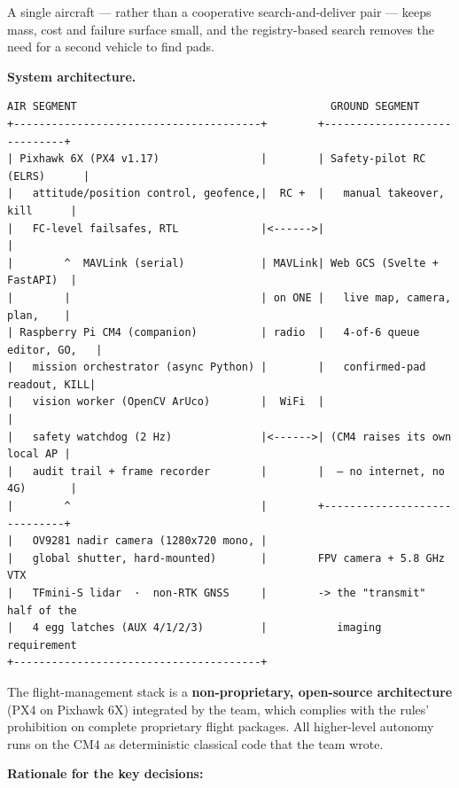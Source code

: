 \documentclass[
  10pt,
  a4paper,
  titlepage]{article}
\begin{document}
A single aircraft --- rather than a cooperative search-and-deliver pair
--- keeps mass, cost and failure surface small, and the registry-based
search removes the need for a second vehicle to find pads.

\textbf{System architecture.}

\begin{verbatim}
AIR SEGMENT                                        GROUND SEGMENT
+---------------------------------------+        +-----------------------------+
| Pixhawk 6X (PX4 v1.17)                |        | Safety-pilot RC (ELRS)      |
|   attitude/position control, geofence,|  RC +  |   manual takeover, kill      |
|   FC-level failsafes, RTL             |<------>|                             |
|        ^  MAVLink (serial)            | MAVLink| Web GCS (Svelte + FastAPI)  |
|        |                              | on ONE |   live map, camera, plan,    |
| Raspberry Pi CM4 (companion)          | radio  |   4-of-6 queue editor, GO,   |
|   mission orchestrator (async Python) |        |   confirmed-pad readout, KILL|
|   vision worker (OpenCV ArUco)        |  WiFi  |                             |
|   safety watchdog (2 Hz)              |<------>| (CM4 raises its own local AP |
|   audit trail + frame recorder        |        |  — no internet, no 4G)       |
|        ^                              |        +-----------------------------+
|   OV9281 nadir camera (1280x720 mono, |
|   global shutter, hard-mounted)       |        FPV camera + 5.8 GHz VTX
|   TFmini-S lidar  ·  non-RTK GNSS     |        -> the "transmit" half of the
|   4 egg latches (AUX 4/1/2/3)         |           imaging requirement
+---------------------------------------+
\end{verbatim}

The flight-management stack is a \textbf{non-proprietary, open-source
architecture} (PX4 on Pixhawk 6X) integrated by the team, which complies
with the rules' prohibition on complete proprietary flight packages. All
higher-level autonomy runs on the CM4 as deterministic classical code
that the team wrote.

\textbf{Rationale for the key decisions:}
\end{document}
